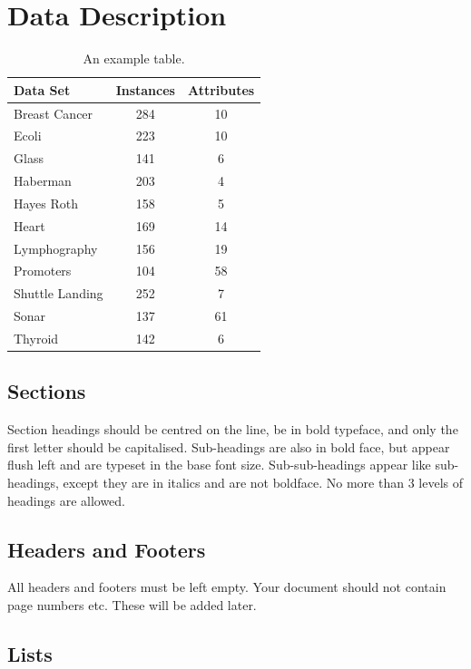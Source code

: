 \documentclass{cmppgr}
\begin{document}
 


\section{Data Description}
\begin{table}[h]
	\centering
	\caption{An example table.}
	\begin{tabular}{|l|c|c|}
		\hline
		Data Set & Instances & Attributes \\\hline\hline
		Breast Cancer & 284 & 10\\
		Ecoli & 223 &10 \\
		Glass & 141 &6  \\
		Haberman & 203  &4 \\
		Hayes Roth & 158 &5 \\
		Heart & 169 & 14\\
		Lymphography & 156 &19 \\
		Promoters & 104 &58  \\
		Shuttle Landing & 252  &7 \\
		Sonar & 137 &61 \\
		Thyroid & 142 & 6\\\hline
	\end{tabular}
	\label{tab:example}
\end{table}




\subsection{Sections}

Section headings should be centred on the line, be in bold typeface, and only the first letter should be capitalised. Sub-headings are also in bold face, but appear flush left and are typeset in the base font size. Sub-sub-headings appear like sub-headings, except they are in italics and are not boldface. No more than 3 levels of headings are allowed.

\subsection{Headers and Footers}

All headers and footers must be left empty. Your document should not contain page numbers etc. These will be added later.

\subsection{Lists}
\end{document}
